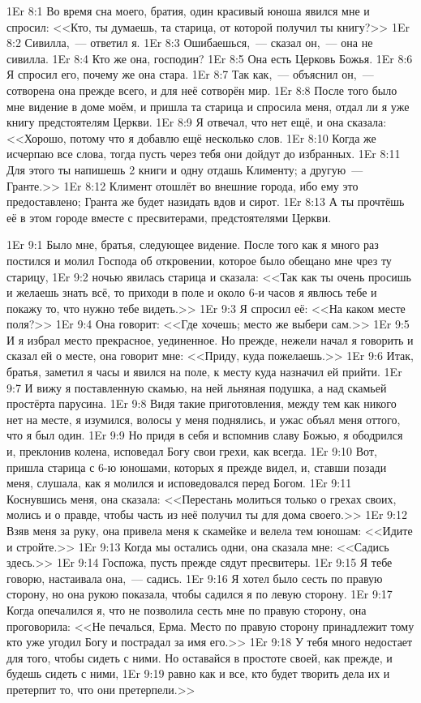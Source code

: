 \vs 1Er 8:1
Во время сна моего,
братия, один красивый юноша явился мне и спросил:
<<Кто, ты думаешь, та старица, от которой получил ты книгу?>>
\vs 1Er 8:2
Сивилла,~--- ответил я.
\vs 1Er 8:3
Ошибаешься,~--- сказал он,~--- она не сивилла.
\vs 1Er 8:4
Кто же она, господин?
\vs 1Er 8:5
Она есть Церковь Божья.
\vs 1Er 8:6
Я спросил его, почему же она стара.
\vs 1Er 8:7
Так как,~--- объяснил он,~--- сотворена она прежде всего,
и для неё сотворён мир.
\vs 1Er 8:8
После того было мне видение в доме моём,
и пришла та старица и спросила меня,
отдал ли я уже книгу предстоятелям Церкви.
\vs 1Er 8:9
Я отвечал, что нет ещё, и она сказала:
<<Хорошо, потому что я добавлю ещё несколько слов.
\vs 1Er 8:10
Когда же исчерпаю все слова,
тогда пусть через тебя они дойдут до избранных.
\vs 1Er 8:11
Для этого ты напишешь 2 книги
и одну отдашь Клименту; а другую~--- Гранте.>>
\vs 1Er 8:12
Климент отошлёт во внешние города, ибо ему это предоставлено;
Гранта же будет назидать вдов и сирот.
\vs 1Er 8:13
А ты прочтёшь её в этом городе вместе с пресвитерами,
предстоятелями Церкви.

\vs 1Er 9:1
Было мне, братья, следующее видение.
После того как я много раз постился и молил
Господа об откровении, которое было обещано мне чрез ту старицу,
\vs 1Er 9:2
ночью явилась старица и сказала:
<<Так как ты очень просишь и желаешь знать всё,
то приходи в поле и около 6-и часов я явлюсь тебе и покажу то,
что нужно тебе видеть.>>
\vs 1Er 9:3
Я спросил её:
<<На каком месте поля?>>
\vs 1Er 9:4
Она говорит:
<<Где хочешь; место же выбери сам.>>
\vs 1Er 9:5
И я избрал место прекрасное, уединенное.
Но прежде, нежели начал я говорить и сказал ей о месте,
она говорит мне:
<<Приду, куда пожелаешь.>>
\vs 1Er 9:6
Итак, братья, заметил я часы и явился на поле,
к месту куда назначил ей прийти.
\vs 1Er 9:7
И вижу я поставленную скамью, на ней льняная подушка,
а над скамьей простёрта парусина.
\vs 1Er 9:8
Видя такие приготовления,
между тем как никого нет на месте,
я изумился, волосы у меня поднялись,
и ужас объял меня оттого, что я был один.
\vs 1Er 9:9
Но придя в себя и вспомнив славу Божью,
я ободрился и, преклонив колена,
исповедал Богу свои грехи, как всегда.
\vs 1Er 9:10
Вот, пришла старица с 6-ю юношами,
которых я прежде видел, и, ставши позади меня,
слушала, как я молился и исповедовался перед Богом.
\vs 1Er 9:11
Коснувшись меня, она сказала:
<<Перестань молиться только о грехах своих,
молись и о правде, чтобы часть из неё получил ты для дома своего.>>
\vs 1Er 9:12
Взяв меня за руку, она привела меня к скамейке
и велела тем юношам:
<<Идите и стройте.>>
\vs 1Er 9:13
Когда мы остались одни, она сказала мне:
<<Садись здесь.>>
\vs 1Er 9:14
Госпожа, пусть прежде сядут пресвитеры.
\vs 1Er 9:15
Я тебе говорю, настаивала она,~--- садись.
\vs 1Er 9:16
Я хотел было сесть по правую сторону,
но она рукою показала,
чтобы садился я по левую сторону.
\vs 1Er 9:17
Когда опечалился я, что не позволила сесть мне
по правую сторону, она проговорила:
<<Не печалься, Ерма.
Место по правую сторону принадлежит тому
кто уже угодил Богу и пострадал за имя его.>>
\vs 1Er 9:18
У тебя много недостает для того, чтобы сидеть с ними.
Но оставайся в простоте своей, как прежде, и будешь сидеть с ними,
\vs 1Er 9:19
равно как и все, кто будет творить дела их и претерпит то,
что они претерпели.>>

